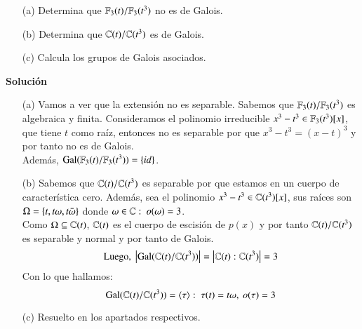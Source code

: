 \begin{ex}[H4.3]$ $
    \begin{itemize}
        \item[(a)] Determina que $\mathbb{F}_3(t) / \mathbb{F}_3(t^3)$ no es de Galois.
        \item[(b)] Determina que $\mathbb{C}(t) / \mathbb{C}(t^3)$ es de Galois.
        \item[(c)] Calcula los grupos de Galois asociados.
    \end{itemize}
    \textbf{Solución}\\
    \begin{itemize}
        \item[(a)] Vamos a ver que la extensión no es separable. Sabemos que $\mathbb{F}_3(t) / \mathbb{F}_3(t^3)$ es algebraica y finita. Consideramos el polinomio irreducible $x^3-t^3 \in \mathbb{F}_3(t^3)[x]$, que tiene $t$ como raíz, entonces no es separable por que $x^3-t^3 = (x-t)^3$ y por tanto no es de Galois.\\
        Además, $\mathrm{Gal}(\mathbb{F}_3(t)/\mathbb{F}_3(t^3)) = \left\{id\right\}$.
        \item[(b)] Sabemos que $\mathbb{C}(t) / \mathbb{C}(t^3)$ es separable por que estamos en un cuerpo de característica cero. Además, sea el polinomio $x^3-t^3 \in \mathbb{C}(t^3)[x]$, sus raíces son $\Omega = \left\{t, t\omega, t\bar\omega\right\}$ donde $\omega \in \C:\ o(\omega)=3$.\\
        Como $\Omega \subseteq \mathbb{C}(t)$, $\mathbb{C}(t)$ es el cuerpo de escisión de $p(x)$ y por tanto $\mathbb{C}(t)/\mathbb{C}(t^3)$ es separable y normal y por tanto de Galois.
        $$
            \text{Luego, } \left|\mathrm{Gal}(\mathbb{C}(t) / \mathbb{C}(t^3))\right| = \left|\mathbb{C}(t) : \mathbb{C}(t^3)\right| = 3
        $$
        Con lo que hallamos:
        $$
            \mathrm{Gal}(\mathbb{C}(t) / \mathbb{C}(t^3)) = \langle\tau\rangle:\ \tau(t) = t\omega,\ o(\tau) = 3
        $$
        \item[(c)] Resuelto en los apartados respectivos.
        \end{itemize}
\end{ex}

